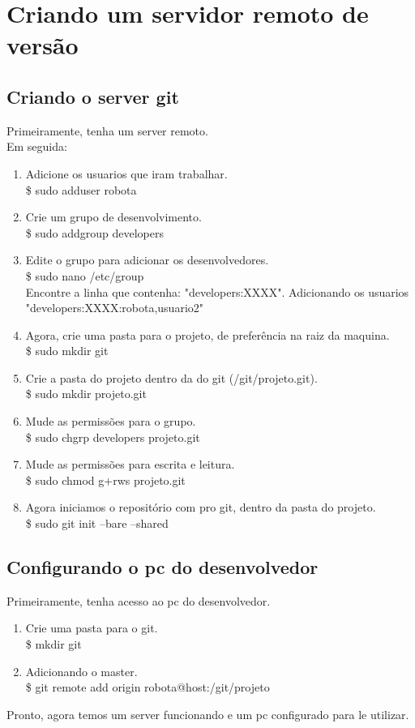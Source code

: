 \section{Criando um servidor remoto de versão}

\subsection{Criando o server git}
Primeiramente, tenha um server remoto. \\
Em seguida: \\

\begin{enumerate}
\item Adicione os usuarios que iram trabalhar.\\
\$ sudo adduser robota \\
\item Crie um grupo de desenvolvimento. \\
\$ sudo addgroup developers \\
\item Edite o grupo para adicionar os desenvolvedores. \\
\$ sudo nano /etc/group \\
Encontre a linha que contenha: "developers:XXXX". Adicionando os usuarios "developers:XXXX:robota,usuario2"
\item Agora, crie uma pasta para o projeto, de prefer\^encia na raiz da maquina. \\
\$ sudo mkdir git  \\
\item Crie a pasta do projeto dentro da do git (/git/projeto.git). \\
\$ sudo mkdir projeto.git \\
\item Mude as permiss\~oes para o grupo. \\
\$ sudo chgrp developers projeto.git \\
\item Mude as permiss\~oes para escrita e leitura. \\
\$ sudo chmod g+rws projeto.git \\
\item Agora iniciamos o reposit\'orio com pro git, dentro da pasta do projeto.\\
\$ sudo git init --bare --shared \\
\end{enumerate}

\subsection{Configurando o pc do desenvolvedor}
Primeiramente, tenha acesso ao pc do desenvolvedor. \\

\begin{enumerate}
\item Crie uma pasta para o git.\\
\$ mkdir git
\item Adicionando o master. \\
\$ git remote add origin robota@host:/git/projeto
\end{enumerate}

Pronto, agora temos um server funcionando e um pc configurado para le utilizar.
